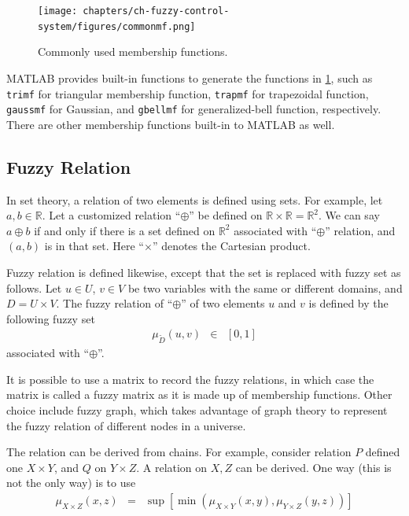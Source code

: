 \begin{figure}
	\centering
	\texttt{[image: chapters/ch-fuzzy-control-system/figures/commonmf.png]}
	\caption{Commonly used membership functions.} \label{ch:fcs:fig:commonmf}
\end{figure}

MATLAB provides built-in functions to generate the functions in \ref{ch:fcs:fig:commonmf}, such as \verb|trimf| for triangular membership function, \verb|trapmf| for trapezoidal function, \verb|gaussmf| for Gaussian, and \verb|gbellmf| for generalized-bell function, respectively. There are other membership functions built-in to MATLAB as well.

\subsection{Fuzzy Relation}

In set theory, a relation of two elements is defined using sets. For example, let $a, b \in \mathbb{R}$. Let a customized relation ``$\oplus$'' be defined on $\mathbb{R} \times \mathbb{R} = \mathbb{R}^2$. We can say $a \oplus b$ if and only if there is a set defined on $\mathbb{R}^2$ associated with ``$\oplus$'' relation, and $(a,b)$ is in that set. Here ``$\times$'' denotes the Cartesian product.

Fuzzy relation is defined likewise, except that the set is replaced with fuzzy set as follows. Let $u\in U$, $v \in V$ be two variables with the same or different domains, and $D=U \times V$. The fuzzy relation of ``$\oplus$'' of two elements $u$ and $v$ is defined by the following fuzzy set
\begin{eqnarray}
	\mu_{\utilde{D}} (u,v) &\in& [0, 1] \nonumber
\end{eqnarray}
associated with ``$\oplus$''.

It is possible to use a matrix to record the fuzzy relations, in which case the matrix is called a fuzzy matrix as it is made up of membership functions. Other choice include fuzzy graph, which takes advantage of graph theory to represent the fuzzy relation of different nodes in a universe.

The relation can be derived from chains. For example, consider relation $P$ defined one $X \times Y$, and $Q$ on $Y \times Z$. A relation on $X, Z$ can be derived. One way (this is not the only way) is to use
\begin{eqnarray}
	\mu_{X \times Z}(x, z) &=& \sup \left[\min\left(\mu_{X\times Y}(x, y), \mu_{Y\times Z} (y, z)\right)\right] \nonumber
\end{eqnarray}

